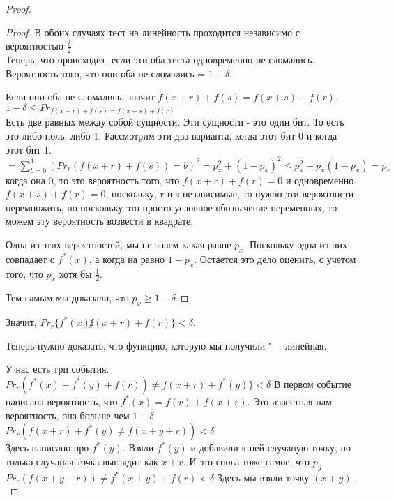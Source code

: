 \begin{proof}
\begin{proof}
		В обоих случаях тест на линейность проходится независимо с вероятностью $\frac{\delta}{2}$\\

		Теперь, что происходит, если эти оба теста одновременно не сломались.
		Вероятность того, что они оба не сломались = $1 - \delta$.

		Если они оба не сломались, значит $f(x + r) + f(s) = f(x + s) + f(r)$.
		$1 - \delta \le Pr_{f(x + r) + f(s) = f(x + s) + f(r)}$\\
		Есть две равных между собой сущности. Эти сущности - это один бит. То есть
		это либо ноль, либо 1. Рассмотрим эти два варианта, когда этот бит 0 и когда
		этот бит 1.
		$= \sum_{b = 0}^{1}(Pr_{r}(f(x + r) + f(s)) = b)^2 = p_x^2 + (1 - p_x)^2 \le p_x^2 + p_x(1 - p_x) = p_x$\\

		когда она 0, то это вероятность того, что $f(x + r) + f(r) = 0$ и одновременно $f(x + s) + f(r) = 0$, поскольку,
		r и s независимые, то нужно эти вероятности перемножить, но поскольку это просто условное обозначение переменных,
		то можем эту вероятность возвести в квадрате.

	 	Одна из этих вероятностей, мы не знаем какая равне $p_x$. Поскольку одна из них
	 	совпадает с $f^*(x)$, а когда на равно $1 - p_x$. Остается это дело оценить, с учетом того, что
	 	$p_x$ хотя бы $\frac{1}{2}$.

	 	Тем самым мы доказали, что $p_x \ge 1 - \delta$	
	\end{proof}	
	
	Значит, $Pr_{r}\{f^*(x) \not f(x + r) + f(r)\} < \delta$.
	
	Теперь нужно доказать, что функцию, которую мы получили "--- линейная. 

	У нас есть три события. 
	$Pr_{r}(f^{*}(x) + f^*(y) + f(r)) \ne f(x + r) + f^{*}(y)\} < \delta$
	В первом событие написана вероятность, что $f^{*}(x) = f(r) + f(x + r)$. 
	Это известная нам вероятность, она больше чем $1 - \delta$\\

	$Pr_{r}(f(x + r) + f^{*}(y) \ne f(x + y + r)) < \delta$\\
	Здесь написано про $f^*(y)$. Взяли $f^*(y)$ и добавили к ней
	случаную точку, но только случаная точка выглядит как $x + r$.
	И это снова тоже самое, что $p_y$.\\

	$Pr_{r}(f(x + y + r)) \ne f^*(x + y) + f(r) < \delta$
	Здесь мы взяли точку $(x + y)$.\\ 


\end{proof}
